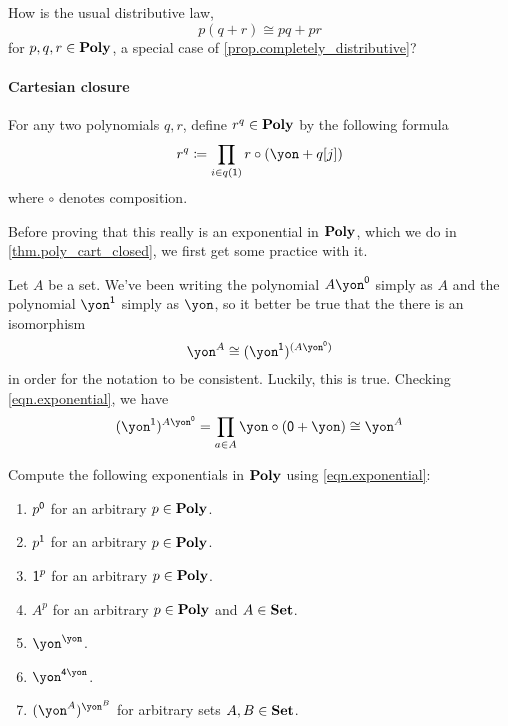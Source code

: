 \documentclass[DynamicalBook]{subfiles}
\begin{document}
\begin{exercise}
How is the usual distributive law,
\[
p(q+r)\cong pq+pr
\]
for $p,q,r\in\textbf{Poly}$, a special case of \cref{prop.completely_distributive}?
\end{exercise}

\paragraph{Cartesian closure}
For any two polynomials $q,r$, define $r^q\in\textbf{Poly}$ by the following formula
\begin{equation}\label{eqn.exponential}
  r^q\coloneqq\prod_{i\in q(\1)}r\circ(\yon+q[j])
\end{equation}
where $\circ$ denotes composition.

Before proving that this really is an exponential in $\textbf{Poly}$, which we do in \cref{thm.poly_cart_closed}, we first get some practice with it.

\begin{example}
Let $A$ be a set. We've been writing the polynomial $A\yon^\0$ simply as $A$ and the polynomial $\yon^\1$ simply as $\yon$, so it better be true that the there is an isomorphism 
\[\yon^A\cong (\yon^\1)^{(A\yon^\0)}\]
in order for the notation to be consistent. Luckily, this is true. Checking \eqref{eqn.exponential}, we have
\[(\yon^\1)^{A\yon^\0}=\prod_{a\in A}\yon\circ(\0+\yon)\cong\yon^A\]
\end{example}

\begin{exercise}
Compute the following exponentials in $\textbf{Poly}$ using \eqref{eqn.exponential}:
\begin{enumerate}
	\item $p^{\textsf{0}}$ for an arbitrary $p\in\textbf{Poly}$.
	\item $p^{\textsf{1}}$ for an arbitrary $p\in\textbf{Poly}$.
	\item $\textsf{1}^p$ for an arbitrary $p\in\textbf{Poly}$.
	\item $A^p$ for an arbitrary $p\in\textbf{Poly}$ and $A\in\textbf{Set}$.
	\item $\yon^\yon$.
	\item $\yon^{\4\yon}$.
	\item $(\yon^A)^{\yon^B}$ for arbitrary sets $A,B\in\textbf{Set}$.
\qedhere
\end{enumerate}
\end{exercise}
\end{document}
